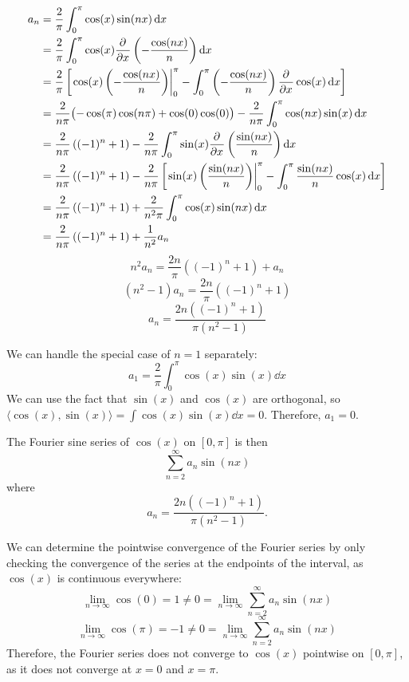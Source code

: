 \documentclass[plain]{pset}
\begin{document}
\begin{solution}
    \begin{align*}
        a_n & = \frac{2}{\pi} \int_0^\pi \cos(x) \sin(nx) \mathop{}\!\mathrm{d} x                                                                                                                                 \\
            & = \frac{2}{\pi} \int_0^\pi \cos(x) \frac{\partial^{} }{\partial x^{}} \left(-\frac{\cos(nx)}{n}\right) \mathop{}\!\mathrm{d} x                                                                                               \\
            & = \frac{2}{\pi} \left[\left. \cos(x) \left(-\frac{\cos(nx)}{n}\right) \right|_0^\pi - \int_0^\pi \left(-\frac{\cos(nx)}{n}\right) \frac{\partial^{} }{\partial x^{}} \cos(x) \mathop{}\!\mathrm{d} x\right]                  \\
            & = \frac{2}{n\pi} \bigl(-\cos(\pi)\cos(n\pi) + \cos(0)\cos(0)\bigr) - \frac{2}{n\pi} \int_0^\pi \cos(nx) \sin(x) \mathop{}\!\mathrm{d} x                                                             \\
            & = \frac{2}{n\pi} \left((-1)^n + 1\right) - \frac{2}{n\pi} \int_0^\pi \sin(x) \frac{\partial^{} }{\partial x^{}} \left(\frac{\sin(nx)}{n}\right) \mathop{}\!\mathrm{d} x                                                      \\
            & = \frac{2}{n\pi} \left((-1)^n + 1\right) - \frac{2}{n\pi} \left[\left. \sin(x) \left(\frac{\sin(nx)}{n}\right) \right|_0^\pi - \int_0^\pi \frac{\sin(nx)}{n} \cos(x) \mathop{}\!\mathrm{d} x\right] \\
            & = \frac{2}{n\pi} \left((-1)^n + 1\right) + \frac{2}{n^2\pi} \int_0^\pi \cos(x) \sin(nx) \mathop{}\!\mathrm{d} x                                                                                     \\
            & = \frac{2}{n\pi} \left((-1)^n + 1\right) + \frac{1}{n^2} a_n
    \end{align*}
    \[n^2 a_n = \frac{2n}{\pi} \left((-1)^n + 1\right) + a_n\]
    \[(n^2 - 1) a_n = \frac{2n}{\pi} \left((-1)^n + 1\right)\]
    \[a_n = \frac{2n\left((-1)^n + 1\right)}{\pi(n^2 - 1)}\]

    We can handle the special case of \(n = 1\) separately:
    \[a_1 = \frac{2}{\pi} \int_0^\pi \cos(x) \sin(x) \dd x\]
    We can use the fact that \(\sin(x)\) and \(\cos(x)\) are orthogonal, so \(\langle\cos(x), \sin(x)\rangle = \int \cos(x) \sin(x) \dd x = 0\). Therefore, \(a_1 = 0\).

    The Fourier sine series of \(\cos(x)\) on \([0, \pi]\) is then
    \[\sum_{n=2}^\infty a_n \sin(nx)\]
    where
    \[a_n = \frac{2n\left((-1)^n + 1\right)}{\pi(n^2 - 1)}.\]

    We can determine the pointwise convergence of the Fourier series by only checking the convergence of the series at the endpoints of the interval, as \(\cos(x)\) is continuous everywhere:
    \[\lim_{n \to \infty} \cos(0) = 1 \neq 0 = \lim_{n \to \infty} \sum_{n=2}^\infty a_n \sin(nx)\]
    \[\lim_{n \to \infty} \cos(\pi) = -1 \neq 0 = \lim_{n \to \infty} \sum_{n=2}^\infty a_n \sin(nx)\]
    Therefore, the Fourier series does not converge to \(\cos(x)\) pointwise on \([0, \pi]\), as it does not converge at \(x = 0\) and \(x = \pi\).
\end{solution}
\end{document}
